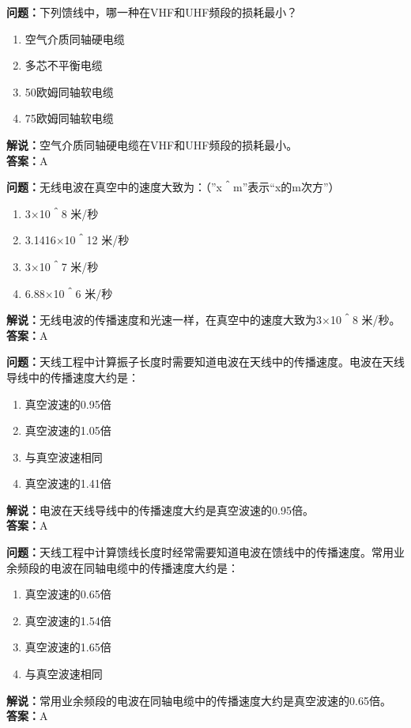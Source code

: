 \documentclass{ctexbook}%
\begin{document}
\textbf{问题：}下列馈线中，哪一种在VHF和UHF频段的损耗最小？
\begin{enumerate}[label=\Alph*), leftmargin=3em]
\item 空气介质同轴硬电缆
\item 多芯不平衡电缆
\item 50欧姆同轴软电缆
\item 75欧姆同轴软电缆
\end{enumerate}
\textbf{解说：}空气介质同轴硬电缆在VHF和UHF频段的损耗最小。\\
\textbf{答案：}A

\textbf{问题：}无线电波在真空中的速度大致为：（”x＾m”表示“x的m次方”）
\begin{enumerate}[label=\Alph*), leftmargin=3em]
\item 3×10＾8 米/秒
\item 3.1416×10＾12 米/秒
\item 3×10＾7 米/秒
\item 6.88×10＾6 米/秒
\end{enumerate}
\textbf{解说：}无线电波的传播速度和光速一样，在真空中的速度大致为3×10＾8 米/秒。\\
\textbf{答案：}A

\textbf{问题：}天线工程中计算振子长度时需要知道电波在天线中的传播速度。电波在天线导线中的传播速度大约是：
\begin{enumerate}[label=\Alph*), leftmargin=3em]
\item 真空波速的0.95倍
\item 真空波速的1.05倍
\item 与真空波速相同
\item 真空波速的1.41倍
\end{enumerate}
\textbf{解说：}电波在天线导线中的传播速度大约是真空波速的0.95倍。\\
\textbf{答案：}A

\textbf{问题：}天线工程中计算馈线长度时经常需要知道电波在馈线中的传播速度。常用业余频段的电波在同轴电缆中的传播速度大约是：
\begin{enumerate}[label=\Alph*), leftmargin=3em]
\item 真空波速的0.65倍
\item 真空波速的1.54倍
\item 真空波速的1.65倍
\item 与真空波速相同
\end{enumerate}
\textbf{解说：}常用业余频段的电波在同轴电缆中的传播速度大约是真空波速的0.65倍。\\
\textbf{答案：}A
\end{document}
